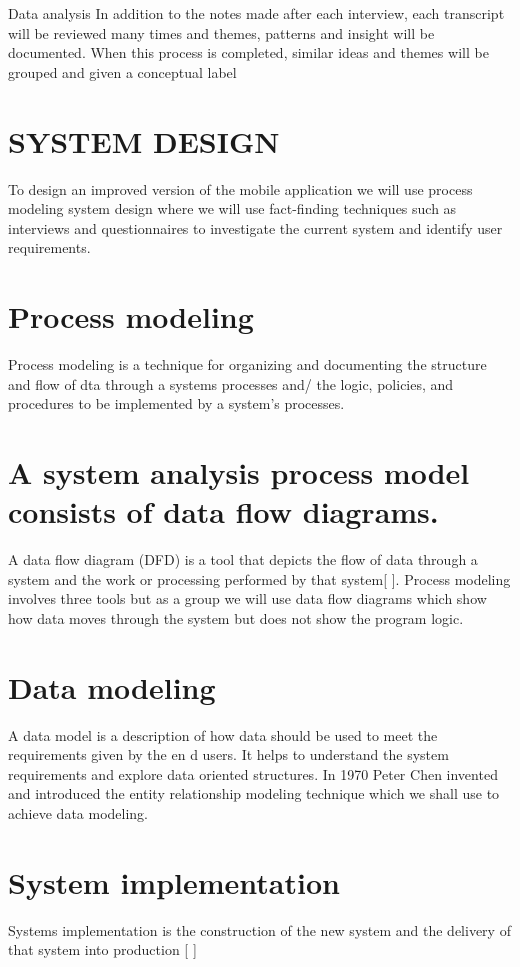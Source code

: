 \documentclass{article}
\begin{document}
{{Data analysis}
In addition to the notes made after each interview, each transcript will be reviewed many times and themes, patterns and insight will be documented. When this process is completed, similar ideas and themes will be grouped and given a conceptual label


\section{SYSTEM DESIGN}

{To design an improved version of the mobile application we will use process modeling system design where we will use fact-finding techniques such as interviews and questionnaires to investigate the current system and identify user requirements.}

\section{Process modeling}
{Process modeling is a technique for organizing and documenting the structure and flow of dta through a systems processes and/ the logic, policies, and procedures to be implemented by a system’s processes.} 
\section{A system analysis process model consists of data flow diagrams.}
{
A data flow diagram (DFD) is a tool that depicts the flow of data through a system and the work or processing performed by that system[   ].
 Process modeling involves three tools but as a group we will use data flow diagrams which show how data moves through the system but does not show the program logic.}

\section{Data modeling} 
{A data model is a description of how data should be used to meet the requirements given by the en d users. It helps to understand the system requirements and explore data oriented structures.
In 1970 Peter Chen invented and introduced the entity relationship modeling technique which we shall use to achieve data modeling.
}

\section{System implementation}
{Systems implementation is the construction of the new system and the delivery of that system into production [   ]
}
}
\end{document}
